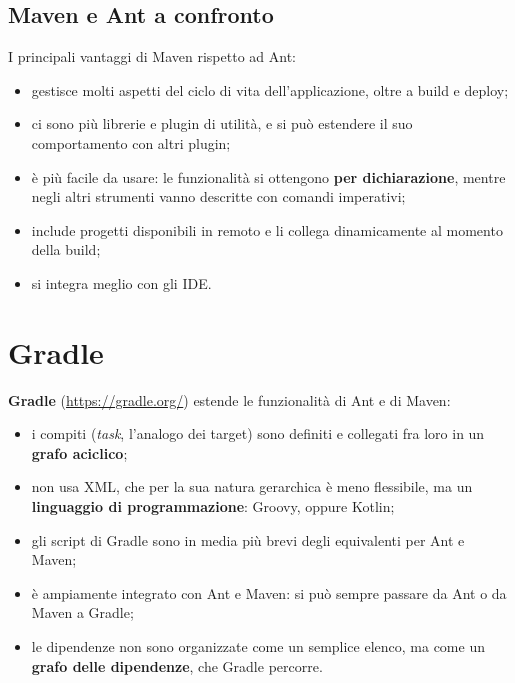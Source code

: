 \subsection{Maven e Ant a confronto}

I principali vantaggi di Maven rispetto ad Ant:

\begin{itemize}
  \item gestisce molti aspetti del ciclo di vita dell'applicazione, oltre a build e deploy;
  \item ci sono più librerie e plugin di utilità, e si può estendere il suo comportamento con altri plugin;
  \item è più facile da usare: le funzionalità si ottengono \textbf{per dichiarazione}, mentre negli altri strumenti
        vanno descritte con comandi imperativi;
  \item include progetti disponibili in remoto e li collega dinamicamente al momento della build;
  \item si integra meglio con gli IDE.
\end{itemize}

\section{Gradle}

\textbf{Gradle} (\url{https://gradle.org/}) estende le funzionalità di Ant e di Maven:

\begin{itemize}
  \item i compiti (\textit{task}, l'analogo dei target) sono definiti e collegati fra loro in un \textbf{grafo
        aciclico};
  \item non usa XML, che per la sua natura gerarchica è meno flessibile, ma un \textbf{linguaggio di programmazione}:
        Groovy, oppure Kotlin;
  \item gli script di Gradle sono in media più brevi degli equivalenti per Ant e Maven;
  \item è ampiamente integrato con Ant e Maven: si può sempre passare da Ant o da Maven a Gradle;
  \item le dipendenze non sono organizzate come un semplice elenco, ma come un \textbf{grafo delle dipendenze}, che
        Gradle percorre.
\end{itemize}


